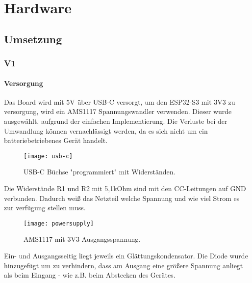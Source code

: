 \graphicspath{ {HW-PIC/} }


\chapter{Hardware}

    \section{Umsetzung}
    
    \subsection{V1}
        \subsubsection{Versorgung}
        Das Board wird mit 5V über USB-C versorgt, um den ESP32-S3 mit 3V3 zu 
        versorgung, wird ein AMS1117 Spannungswandler verwenden. Dieser wurde ausgewählt, 
        aufgrund der einfachen Implementierung. Die Verluste bei der Umwandlung können vernachlässigt werden, da 
        es sich nicht um ein batteriebetriebenes Gerät handelt.

            \begin{figure}[h]
                \centering
                \texttt{[image: usb-c]}
                \caption{USB-C Büchse "programmiert" mit Widerständen.}
                \label{fig:sch1}

            \end{figure}

        Die Widerstände R1 und R2 mit 5,1kOhm sind mit den CC-Leitungen auf GND verbunden.
        Dadurch weiß das Netzteil welche Spannung und wie viel Strom es zur verfügung stellen
        muss. 

            \begin{figure}[h]
                \centering
                \texttt{[image: powersupply]}
                \caption{AMS1117 mit 3V3 Ausgangsspannung.}
                \label{fig:sch2}
                
            \end{figure}

        Ein- und Ausgangsseitig liegt jeweils ein Glättungskondensator. Die Diode wurde hinzugefügt 
        um zu verhindern, dass am Ausgang eine größere Spannung
        anliegt als beim Eingang - wie z.B. beim Abstecken des Gerätes.

